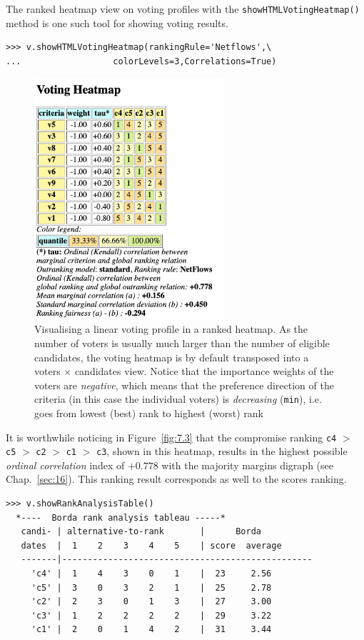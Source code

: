 The \NetFlows ranked heatmap view on voting profiles with the \texttt{showHTML\-VotingHeatmap()} method is one such tool for showing voting results.
\begin{lstlisting}
>>> v.showHTMLVotingHeatmap(rankingRule='Netflows',\
...                  colorLevels=3,Correlations=True)
\end{lstlisting}
\begin{figure}[ht]
\sidecaption[t]
\includegraphics[width=7cm]{Figures/7-3-votingHeatmap.png}
\caption{Visualising a linear voting profile in a \NetFlows ranked heatmap. As the number of voters is usually much larger than the number of eligible candidates, the voting heatmap is by default transposed into a voters $\times$ candidates view. Notice that the importance weights of the voters are \emph{negative}, which means that the preference direction of the criteria (in this case the individual voters) is \emph{decreasing} (\texttt{min}), i.e. goes from lowest (best) rank to highest (worst) rank}
\label{fig:7.3}       %
\end{figure}

It is worthwhile noticing in Figure~\vref{fig:7.3} that the compromise \NetFlows ranking \texttt{c4} $>$ \texttt{c5} $>$ \texttt{c2} $>$ \texttt{c1} $>$ \texttt{c3}, shown in this heatmap, results in the highest possible \emph{ordinal correlation} index of $+0.778$ with the majority margins digraph (see Chap.~\ref{sec:16}). This \NetFlows ranking result corresponds as well to the \Borda scores ranking.
\begin{lstlisting}
>>> v.showRankAnalysisTable()
  *----  Borda rank analysis tableau -----*
   candi- | alternative-to-rank       |      Borda
   dates  |  1    2    3    4    5    | score  average
   -------|-------------------------------------------------
     'c4' |  1    4    3    0    1    |  23     2.56
     'c5' |  3    0    3    2    1    |  25     2.78
     'c2' |  2    3    0    1    3    |  27     3.00
     'c3' |  1    2    2    2    2    |  29     3.22
     'c1' |  2    0    1    4    2    |  31     3.44
\end{lstlisting}


